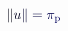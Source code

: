\documentclass[12pt]{article}
\begin{document}
\makeatletter
\renewcommand*{\@textcolor}[3]{%
  \protect\leavevmode
  \begingroup
    \color#1{#2}#3%
  \endgroup
}
\makeatother
\begin{displaymath}
\mathcolor[RGB]{0,0,15}{\|} \mathcolor[RGB]{0,0,30}{u} \mathcolor[RGB]{0,0,45}{\|} \mathcolor[RGB]{0,0,60}{=} \mathcolor[RGB]{0,0,75}{\pi} _ { \mathrm { \mathcolor[RGB]{0,0,90}{p} } }
\end{displaymath}
\end{document}
